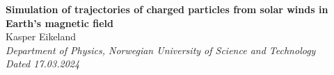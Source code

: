 
\begin{center}
{ \huge \bfseries Simulation of trajectories of charged particles from solar winds in Earth's magnetic field}\\[0.4cm]
{\large  Kasper Eikeland} \\[0.4cm]
\textit{Department of Physics, Norwegian University of Science and Technology} \\
{ \textit{Dated 17.03.2024}}
\end{center}
